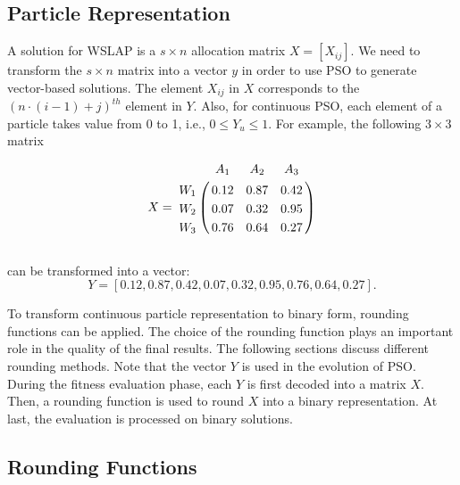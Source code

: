 \documentclass[10pt,journal,compsoc]{IEEEtran}
\let\bbordermatrix\bordermatrix
\begin{document}
\vspace{-3 mm}
\subsection{Particle Representation}
A solution for WSLAP is a $s \times n$ allocation matrix $X =[X_{ij}]$. We need to transform the $s \times n$ matrix into a vector $y$ in order to use PSO to generate vector-based solutions. The element $X_{ij}$ in $X$ corresponds to the $ (n \cdot (i-1) +j)^{th}$ element in $Y$. Also, for continuous PSO, each element of a particle takes value from 0 to 1, i.e., $0 \leq  Y_u  \leq 1$. For example, the following $3 \times 3$ matrix

\small
\begin{equation*}
\begin{aligned}
 X = \bbordermatrix{~ & A_{1} & A_{2} & A_{3} \cr
      W_{1} &0.12 &0.87 &0.42 \cr
      W_{2} &0.07  &0.32 &0.95 \cr
      W_{3} &0.76 &0.64 &0.27 \cr}\\
\end{aligned}
\end{equation*}\\
\normalsize
can be transformed into a vector:
\small
$$
Y = [0.12, 0.87, 0.42, 0.07, 0.32, 0.95, 0.76, 0.64, 0.27].
$$
\normalsize

To transform continuous particle representation to binary form, rounding functions can be applied. The choice of the rounding function plays an important role in the quality of the final results. The following sections discuss different rounding methods. Note that the vector $Y$ is used in the evolution of PSO. During the fitness evaluation phase, each $Y$ is first decoded into a matrix $X$. Then, a rounding function is used to round $X$ into a binary representation. At last, the evaluation is processed on binary solutions.


\vspace{-3 mm}
\subsection{Rounding Functions}
\end{document}
